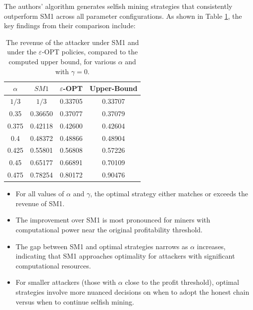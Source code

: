 \documentclass[conference]{IEEEtran}
\begin{document}
The authors' algorithm generates selfish mining strategies that consistently outperform SM1 across all parameter configurations. As shown in Table \ref{table:comparison_with_sm1}, the key findings from their comparison include:

\begin{table}[h!]
    \centering
    \caption{The revenue of the attacker under SM1 and under the $\varepsilon$-OPT policies, compared to the computed upper bound, for various $\alpha$ and with $\gamma = 0$.}
    \label{table:comparison_with_sm1}
    \begin{tabular}{|c|c|c|c|}
        \hline
        $\alpha$ & $SM1$ & $\varepsilon$-OPT & Upper-Bound \\
        \hline
        $1/3$ & $1/3$ & 0.33705 & 0.33707 \\
        \hline
        0.35 & 0.36650 & 0.37077 & 0.37079 \\
        \hline
        0.375 & 0.42118 & 0.42600 & 0.42604 \\
        \hline
        0.4 & 0.48372 & 0.48866 & 0.48904 \\
        \hline
        0.425 & 0.55801 & 0.56808 & 0.57226 \\
        \hline
        0.45 & 0.65177 & 0.66891 & 0.70109 \\
        \hline
        0.475 & 0.78254 & 0.80172 & 0.90476 \\
        \hline
    \end{tabular}
\end{table}

\begin{itemize}
    \item For all values of $\alpha$ and $\gamma$, the optimal strategy either matches or exceeds the revenue of SM1.
    
    \item The improvement over SM1 is most pronounced for miners with computational power near the original profitability threshold.
    
    \item The gap between SM1 and optimal strategies narrows as $\alpha$ increases, indicating that SM1 approaches optimality for attackers with significant computational resources.
    
    \item For smaller attackers (those with $\alpha$ close to the profit threshold), optimal strategies involve more nuanced decisions on when to adopt the honest chain versus when to continue selfish mining.
\end{itemize}
\end{document}
